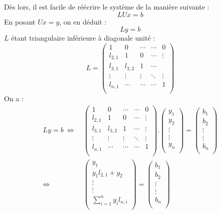 \documentclass[a4paper, titlepage]{livret}													%
\begin{document}
			Dès lors, il est facile de réécrire le système de la manière suivante :
				\[ LUx = b \] 
			En posant $Ux = y$, on en déduit :
				\[ Ly = b \]
			$L$ étant triangulaire inférieure à diagonale unité :
				\[ 
					L = 
					\begin{pmatrix}
						1 & 0 & \cdots & \cdots & 0\\
						l_{2,1} & 1 & 0 & \cdots& \vdots \\
						l_{3,1} & l_{3,2} & 1 & \cdots\\
						\vdots& \vdots & \vdots & \ddots & \vdots \\
						l_{n,1} & \cdots & \cdots & \cdots & 1\\
					\end{pmatrix} 
				\]
			On a :
				\begin{align*}
					Ly = b \
					\Leftrightarrow &
						\ \begin{pmatrix}
							1 & 0 & \cdots & \cdots & 0 \\
							l_{2,1} & 1 & 0 & \cdots & \vdots \\
							l_{3,1} & l_{3,2} & 1 & \cdots & \vdots\\
							\vdots& \vdots & \vdots & \ddots & \vdots \\
							l_{n,1} & \cdots & \cdots & \cdots & 1\\
						\end{pmatrix} .
						\begin{pmatrix}
							y_{1} \\
							y_{2} \\
							\vdots \\
							\vdots \\
							y_{n} \\
						\end{pmatrix} =
						\begin{pmatrix}
							b_{1} \\
							b_{2} \\
							\vdots \\
							\vdots \\
							b_{n} \\
						\end{pmatrix} \\
					\Leftrightarrow &
						\ \begin{pmatrix}
							y_{1} \\
							y_{1}l_{2, 1} + y_{2} \\
							\vdots \\
							\vdots \\
							\sum_{i = 1}^{n} y_{i}l_{n, i}\\
						\end{pmatrix} =
						\begin{pmatrix}
							b_{1} \\
							b_{2} \\
							\vdots \\
							\vdots \\
							b_{n} \\
						\end{pmatrix}
				\end{align*}
\end{document}
